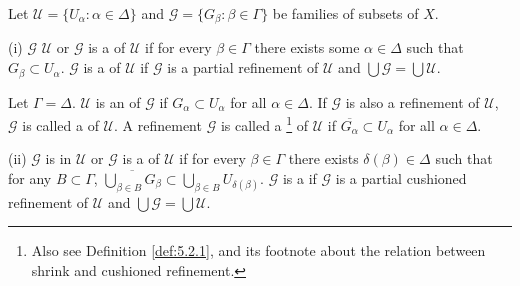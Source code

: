 \documentclass[main.tex]{subfiles}
\begin{document}
{ \label{def:1.1.2} Let
 $\mathscr{U} = \{ U_\alpha: \alpha\in \Delta\}$ and 
	$\mathscr{G} = \{ G_\beta: \beta\in \Gamma\}$
	be families of subsets of $X$.
	
	\textup{(i)} $\mathscr{G}$ 
	$\mathscr{U}$ or  $\mathscr{G}$ is a 
	of $\mathscr{U}$ if for every $\beta\in \Gamma$
	there exists some $\alpha\in \Delta$ such that 
	$G_\beta\subset U_\alpha$.
	$\mathscr{G}$ is a 
	of $\mathscr{U}$ if $\mathscr{G}$ is a partial refinement of 
	$\mathscr{U}$ and $\bigcup\mathscr{G} = \bigcup\mathscr{U}$.
	
Let $\Gamma = \Delta$. 
	$\mathscr{U}$ is an 
	of $\mathscr{G}$ if $G_\alpha \subset U_\alpha$ for all $\alpha\in \Delta$.
If $\mathscr{G}$ is also a  refinement of $\mathscr{U}$,  $\mathscr{G}$ is called a
	of $\mathscr{U}$.
A refinement $\mathscr{G}$ is called a 
	 \footnote{Also see Definition \ref{def:5.2.1}, 
		and its footnote about the relation between shrink and cushioned refinement.}
	of $\mathscr{U}$
	if $\overline{G_\alpha} \subset U_\alpha$ for all $\alpha\in \Delta$.
	
	\textup{(ii)} $\mathscr{G}$ is 
	in $\mathscr{U}$ or
	$\mathscr{G}$ is a 
	of $\mathscr{U}$
	if for every $\beta\in\Gamma$ there exists $\delta(\beta)\in\Delta$ such that for any $B\subset\Gamma$, $\overline{\bigcup_{\beta\in B}G_\beta} \subset \bigcup_{\beta\in B}U_{\delta(\beta)}$. 
	$\mathscr{G}$ is a 
	if $\mathscr{G}$ is a partial cushioned refinement
	of $\mathscr{U}$ and $\bigcup\mathscr{G} = \bigcup\mathscr{U} $.
} %
\end{document}
